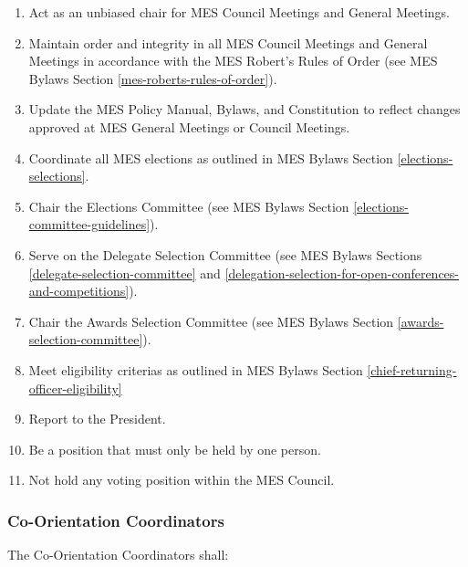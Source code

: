 \begin{enumerate}
 \item
  Act as an unbiased chair for MES Council Meetings and General
  Meetings.
 \item
  Maintain order and integrity in all MES Council Meetings and General
  Meetings in accordance with the MES Robert's Rules of Order (see MES Bylaws Section \ref{mes-roberts-rules-of-order}).
 \item
  Update the MES Policy Manual, Bylaws, and Constitution to reflect
  changes approved at MES General Meetings or Council Meetings.
 \item
  Coordinate all MES elections as outlined in MES Bylaws Section \ref{elections-selections}.
 \item
  Chair the Elections Committee (see MES Bylaws Section \ref{elections-committee-guidelines}).
 \item
  Serve on the Delegate Selection Committee (see MES Bylaws Sections
  \ref{delegate-selection-committee} and \ref{delegation-selection-for-open-conferences-and-competitions}).
 \item
  Chair the Awards Selection Committee (see MES Bylaws Section \ref{awards-selection-committee}).
 \item
  Meet eligibility criterias as outlined in MES Bylaws Section \ref{chief-returning-officer-eligibility}
 \item
  Report to the President.
 \item
  Be a position that must only be held by one person.
 \item
  Not hold any voting position within the MES Council.

\end{enumerate}

\hypertarget{co-orientation-coordinators}{%
 \subsubsection{Co-Orientation
  Coordinators}
 \label{co-orientation-coordinators}}
The Co-Orientation Coordinators shall:

